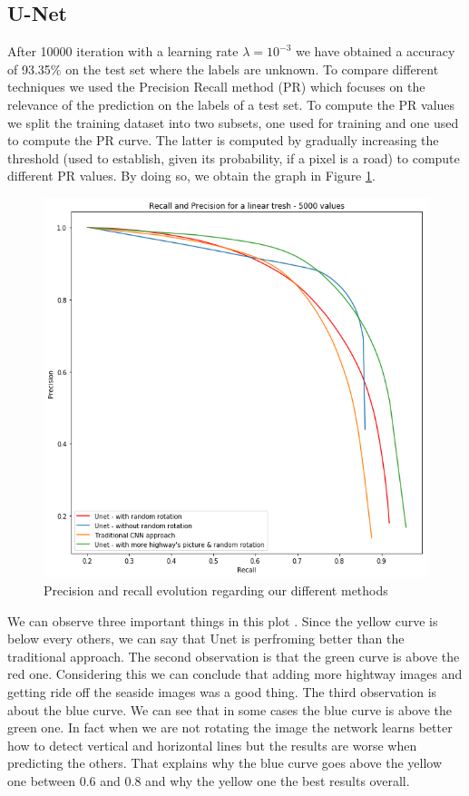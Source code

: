 \documentclass[10pt,conference,compsocconf]{IEEEtran}
\begin{document}
\subsection{U-Net}
	After 10000 iteration with a learning rate $\lambda = 10^{-3}$ we have obtained a accuracy of 93.35\% on the test set where the labels are unknown.
	To compare different techniques we used the Precision Recall method (PR) which focuses on the relevance of the prediction on the labels of a test set. To compute the PR values we split the training dataset into two subsets, one used for training and one used to compute the PR curve. The latter is computed by gradually increasing the threshold (used to establish, given its probability, if a pixel is a road) to compute different PR values. By doing so, we obtain the graph in Figure \ref{fig:pr}.
	\begin{figure}[h]
		\centering
		\includegraphics[width=0.8\columnwidth]{img/pr_curve.png}
		\caption{Precision and recall evolution regarding our different methods}
		\label{fig:pr}
	\end{figure}
	
	We can observe three important things in this plot . Since the yellow curve is below every others, we can say that Unet is perfroming better than the traditional approach. The second observation is that the green curve is above the red one. Considering this we can conclude that adding more hightway images and getting ride off the seaside images was a good thing. The third observation is about the blue curve. We can see that in some cases the blue curve is above the green one. In fact when we are not rotating the image the network learns better how to detect vertical and horizontal lines but the results are worse when predicting the others. That explains why the blue curve goes above the yellow one between 0.6 and 0.8 and why the yellow one the best results overall.
\end{document}
